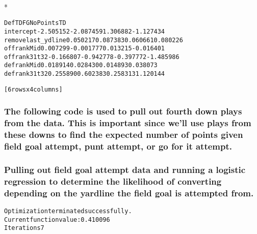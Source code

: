 \documentclass[letterpaper,10pt,english]{/anaconda/lib/python2.7/site-packages/sphinx/texinputs/sphinxhowto}
\def\smaller{\fontsize{9.5pt}{9.5pt}\selectfont}
\newenvironment{InvisibleVerbatim}
        {\begin{mdframed}[leftmargin=0.1\linewidth,innerleftmargin=3pt,innerrightmargin=3pt, userdefinedwidth=1\linewidth, linewidth=0pt, linecolor=white, usetwoside=false]}
        {\end{mdframed}}
\begin{document}
                \makebox[0.1\linewidth]{\smaller\hfill\tt\color{nbframe-out-prompt}Out\hspace{4pt}{[}16{]}:\hspace{4pt}}\\*
                \vspace{-2.55\baselineskip}\begin{InvisibleVerbatim}
                \vspace{-0.5\baselineskip}
\begin{alltt}                      DefTD        FG  NoPoints        TD
intercept         -2.505152 -2.087459  1.306882 -1.127434
removelast\_ydline  0.050217  0.087383  0.060661  0.080226
offrankMid         0.007299 -0.001777  0.013215 -0.016401
offrank31t32      -0.166807 -0.942778 -0.397772 -1.485986
defrankMid         0.018914  0.028430  0.014893  0.038073
defrank31t32       0.255890  0.602383  0.258313  1.120144

[6 rows x 4 columns]\end{alltt}

            \end{InvisibleVerbatim}
            
        
    
\subsubsection{The following code is used to pull out fourth down plays from the data.
This is important since we'll use plays from these downs to find the
expected number of points given field goal attempt, punt attempt, or go
for it attempt.}

\subsubsection{Pulling out field goal attempt data and running a logistic regression to
determine the likelihood of converting depending on the yardline the
field goal is attempted from.}


    

        
        

            
                \begin{InvisibleVerbatim}
                \vspace{-0.5\baselineskip}
\begin{alltt}Optimization terminated successfully.
         Current function value: 0.410096
         Iterations 7
\end{alltt}

            \end{InvisibleVerbatim}
            
\end{document}
